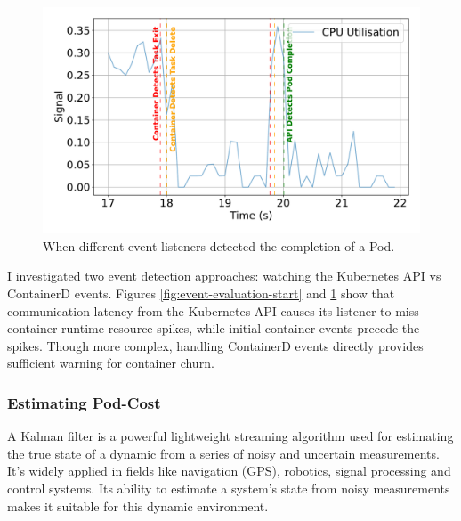 \begin{figure}[ht]
    \centering
    \includegraphics[width=\textwidth]{images/event-comparison-end.pdf}
    \caption{When different event listeners detected the completion of a Pod.}
    \label{fig:event-evaluation-end}
\end{figure}

I investigated two event detection approaches: watching the Kubernetes API vs
ContainerD events. Figures \ref{fig:event-evaluation-start} and
\ref{fig:event-evaluation-end} show that communication latency from the
Kubernetes API causes its listener to miss container runtime resource spikes,
while initial container events precede the spikes. Though more complex, handling
ContainerD events directly provides sufficient warning for container churn.

\subsubsection{Estimating Pod-Cost}
\label{sec:estimating-cost}
A Kalman filter \cite{} is a powerful lightweight streaming algorithm used for
estimating the true state of a dynamic from a series of noisy and uncertain
measurements. It's widely applied in fields like navigation (GPS), robotics,
signal processing and control systems. Its ability to estimate a system's state
from noisy measurements makes it suitable for this dynamic environment.

